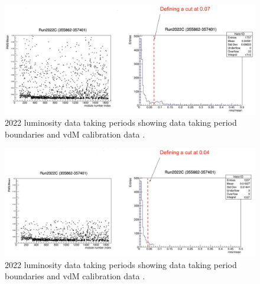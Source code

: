\begin{figure}[!htp]
\centering
\includegraphics[width=1\textwidth]{ashish_thesis/2022_periodC_first_iteration}
\caption[2018 CMS luminosity data taking periods.]{%
  2022 luminosity data taking periods showing data taking period boundaries and vdM calibration data  \cite{CERNLumiPublicResults}.
}
\label{fig:period_bound}
\end{figure}





\begin{figure}[!htp]
\centering
\includegraphics[width=1\textwidth]{ashish_thesis/2022_periodC_final_iteration.png}
\caption[2018 CMS luminosity data taking periods.]{%
  2022 luminosity data taking periods showing data taking period boundaries and vdM calibration data  \cite{CERNLumiPublicResults}.
}
\label{fig:period_bound}
\end{figure}







